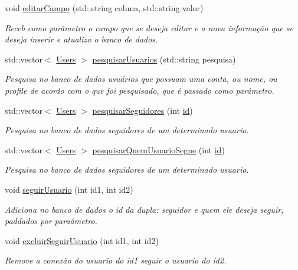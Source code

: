 \begin{DoxyCompactItemize}
void \hyperlink{class_t_a_d_1_1_users_a470cdc28ff46aadd7edb708f0838ae43}{editar\+Campo} (std\+::string coluna, std\+::string valor)
\begin{DoxyCompactList}\small\item\em Receb como parâmetro o campo que se deseja editar e a nova informação que se deseja inserir e atualiza o banco de dados. \end{DoxyCompactList}\item 
std\+::vector$<$ \hyperlink{class_t_a_d_1_1_users}{Users} $>$ \hyperlink{class_t_a_d_1_1_users_ad1e42eb4429af0ed1399d72f8c531c27}{pesquisar\+Usuarios} (std\+::string pesquisa)
\begin{DoxyCompactList}\small\item\em Pesquisa no banco de dados usuários que possuam uma conta, ou nome, ou profile de acordo com o que foi pesquisado, que é passado como parâmetro. \end{DoxyCompactList}\item 
std\+::vector$<$ \hyperlink{class_t_a_d_1_1_users}{Users} $>$ \hyperlink{class_t_a_d_1_1_users_ad9fbbedbd2731b8738c855e97b9d827b}{pesquisar\+Seguidores} (int \hyperlink{class_t_a_d_1_1_users_a8b8c32b02b9bd942d844d738d94ff21b}{id})
\begin{DoxyCompactList}\small\item\em Pesquisa no banco de dados seguidores de um determinado usuario. \end{DoxyCompactList}\item 
std\+::vector$<$ \hyperlink{class_t_a_d_1_1_users}{Users} $>$ \hyperlink{class_t_a_d_1_1_users_adfcb38a558ad5321af0a46b7bbbf9b02}{pesquisar\+Quem\+Usuario\+Segue} (int \hyperlink{class_t_a_d_1_1_users_a8b8c32b02b9bd942d844d738d94ff21b}{id})
\begin{DoxyCompactList}\small\item\em Pesquisa no banco de dados seguidores de um determinado usuario. \end{DoxyCompactList}\item 
void \hyperlink{class_t_a_d_1_1_users_accb3e1b0025c87abeeda01895a7e3cc2}{seguir\+Usuario} (int id1, int id2)
\begin{DoxyCompactList}\small\item\em Adiciona no banco de dados o id da dupla\+: seguidor e quem ele deseja seguir, paddados por paraâmetro. \end{DoxyCompactList}\item 
void \hyperlink{class_t_a_d_1_1_users_af1272c5f3545fffad21e12e1fc90cb6e}{excluir\+Seguir\+Usuario} (int id1, int id2)
\begin{DoxyCompactList}\small\item\em Remove a conexão do usuario do id1 seguir o usuario do id2. \end{DoxyCompactList}\end{DoxyCompactItemize}
